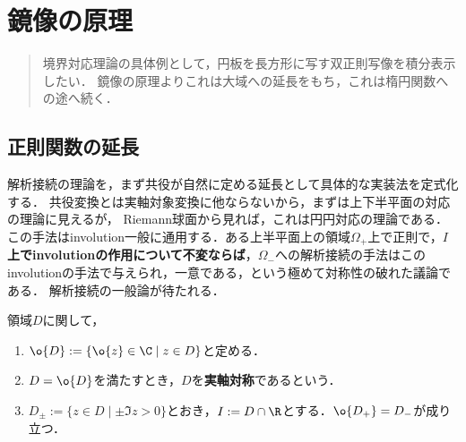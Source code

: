 \documentclass[uplatex, dvipdfmx]{jsreport}
\begin{document}
\chapter{鏡像の原理}

\begin{quotation}
    境界対応理論の具体例として，円板を長方形に写す双正則写像を積分表示したい．
    鏡像の原理よりこれは大域への延長をもち，これは楕円関数への途へ続く．
\end{quotation}

\section{正則関数の延長}

\begin{tcolorbox}[colframe=ForestGreen, colback=ForestGreen!10!white,breakable,colbacktitle=ForestGreen!40!white,coltitle=black,fonttitle=\bfseries\sffamily,
title=involutionが定める解析接続]
    解析接続の理論を，まず共役が自然に定める延長として具体的な実装法を定式化する．
    共役変換とは実軸対象変換に他ならないから，まずは上下半平面の対応の理論に見えるが，
    Riemann球面から見れば，これは円円対応の理論である．
    この手法はinvolution一般に通用する．ある上半平面上の領域$\Omega_+$上で正則で，\textbf{$I$上でinvolutionの作用について不変ならば}，$\Omega_-$への解析接続の手法はこのinvolutionの手法で与えられ，一意である，という極めて対称性の破れた議論である．
    解析接続の一般論が待たれる．
\end{tcolorbox}

\begin{notation}[領域の演算]
    領域$D$に関して，
    \begin{enumerate}
        \item $\o{D}:=\{\o{z}\in\C\mid z\in D\}$と定める．
        \item $D=\o{D}$を満たすとき，$D$を\textbf{実軸対称}であるという．
        \item $D_\pm:=\{z\in D\mid\pm\Im z>0\}$とおき，$I:=D\cap\R$とする．$\o{D_+}=D_-$が成り立つ．
    \end{enumerate}
\end{notation}
\end{document}
